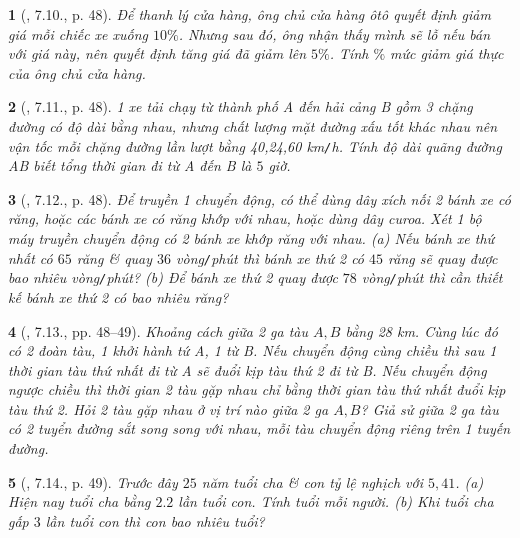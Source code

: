 \documentclass{article}
\newtheorem{baitoan}{}
\begin{document}
\begin{baitoan}[\cite{Binh_boi_duong_Toan_7_tap_1}, 7.10., p. 48]
	Để thanh lý cửa hàng, ông chủ cửa hàng ôtô quyết định giảm giá mỗi chiếc xe xuống $10\%$. Nhưng sau đó, ông nhận thấy mình sẽ lỗ nếu bán với giá này, nên quyết định tăng giá đã giảm lên $5\%$. Tính $\%$ mức giảm giá thực của ông chủ cửa hàng.
\end{baitoan}

\begin{baitoan}[\cite{Binh_boi_duong_Toan_7_tap_1}, 7.11., p. 48]
	1 xe tải chạy từ thành phố A đến hải cảng B gồm 3 chặng đường có độ dài bằng nhau, nhưng chất lượng mặt đường xấu tốt khác nhau nên vận tốc mỗi chặng đường lần lượt bằng {\rm40,24,60 km{\tt/}h}. Tính độ dài quãng đường AB biết tổng thời gian đi từ A đến B là $5$ giờ.
\end{baitoan}

\begin{baitoan}[\cite{Binh_boi_duong_Toan_7_tap_1}, 7.12., p. 48]
	Để truyền 1 chuyển động, có thể dùng dây xích nối 2 bánh xe có răng, hoặc các bánh xe có răng khớp với nhau, hoặc dùng dây curoa. Xét 1 bộ máy truyền chuyển động có 2 bánh xe khớp răng với nhau. (a) Nếu bánh xe thứ nhất có $65$ răng \& quay $36$ vòng{\tt/}phút thì bánh xe thứ 2 có $45$ răng sẽ quay được bao nhiêu vòng{\tt/}phút? (b) Để bánh xe thứ 2 quay được $78$ vòng{\tt/}phút thì cần thiết kế bánh xe thứ 2 có bao nhiêu răng?
\end{baitoan}

\begin{baitoan}[\cite{Binh_boi_duong_Toan_7_tap_1}, 7.13., pp. 48--49]
	Khoảng cách giữa 2 ga tàu $A,B$ bằng {\rm28 km}. Cùng lúc đó có 2 đoàn tàu, 1 khởi hành tứ A, 1 từ B. Nếu chuyển động cùng chiều thì sau 1 thời gian tàu thứ nhất đi từ A sẽ đuổi kịp tàu thứ 2 đi từ B. Nếu chuyển động ngược chiều thì thời gian 2 tàu gặp nhau chỉ bằng thời gian tàu thứ nhất đuổi kịp tàu thứ 2. Hỏi 2 tàu gặp nhau ở vị trí nào giữa 2 ga $A,B$? Giả sử giữa 2 ga tàu có 2 tuyển đường sắt song song với nhau, mỗi tàu chuyển động riêng trên 1 tuyến đường.
\end{baitoan}

\begin{baitoan}[\cite{Binh_boi_duong_Toan_7_tap_1}, 7.14., p. 49]
	Trước đây $25$ năm tuổi cha \& con tỷ lệ nghịch với $5,41$. (a) Hiện nay tuổi cha bằng $2.2$ lần tuổi con. Tính tuổi mỗi người. (b) Khi tuổi cha gấp $3$ lần tuổi con thì con bao nhiêu tuổi?
\end{baitoan}
\end{document}
